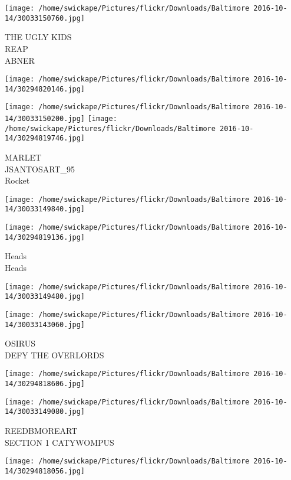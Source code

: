 \documentclass[10pt,letterpaper]{article}
\begin{document}
\vspace{0.25in}
\texttt{[image: /home/swickape/Pictures/flickr/Downloads/Baltimore 2016-10-14/30033150760.jpg]}

THE UGLY KIDS\\
REAP\\
ABNER
\pagebreak

\texttt{[image: /home/swickape/Pictures/flickr/Downloads/Baltimore 2016-10-14/30294820146.jpg]}

\vspace{0.25in}
\texttt{[image: /home/swickape/Pictures/flickr/Downloads/Baltimore 2016-10-14/30033150200.jpg]}
\texttt{[image: /home/swickape/Pictures/flickr/Downloads/Baltimore 2016-10-14/30294819746.jpg]}

MARLET\\
JSANTOSART\_95\\
Rocket
\pagebreak

\texttt{[image: /home/swickape/Pictures/flickr/Downloads/Baltimore 2016-10-14/30033149840.jpg]}

\vspace{0.25in}
\texttt{[image: /home/swickape/Pictures/flickr/Downloads/Baltimore 2016-10-14/30294819136.jpg]}

Heads\\
Heads
\pagebreak

\texttt{[image: /home/swickape/Pictures/flickr/Downloads/Baltimore 2016-10-14/30033149480.jpg]}

\vspace{0.25in}
\texttt{[image: /home/swickape/Pictures/flickr/Downloads/Baltimore 2016-10-14/30033143060.jpg]}

OSIRUS\\
DEFY THE OVERLORDS
\pagebreak

\texttt{[image: /home/swickape/Pictures/flickr/Downloads/Baltimore 2016-10-14/30294818606.jpg]}

\vspace{0.25in}
\texttt{[image: /home/swickape/Pictures/flickr/Downloads/Baltimore 2016-10-14/30033149080.jpg]}

REEDBMOREART\\
SECTION 1 CATYWOMPUS
\pagebreak

\texttt{[image: /home/swickape/Pictures/flickr/Downloads/Baltimore 2016-10-14/30294818056.jpg]}
\end{document}

